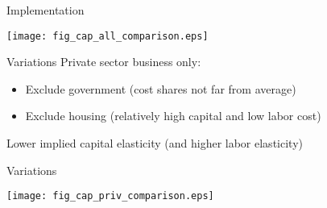 \documentclass[10pt, xcolor=dvipsnames]{beamer}
\begin{document}
%
%





\begin{frame}{Implementation}
\begin{center}
\texttt{[image: fig\_cap\_all\_comparison.eps]}
\end{center}
\end{frame}


\begin{frame}{Variations}
Private sector business only:
\begin{itemize}
   \item Exclude government (cost shares not far from average)
   \item Exclude housing (relatively high capital and low labor cost)
\end{itemize} 

Lower implied capital elasticity (and higher labor elasticity)

\end{frame}

\begin{frame}{Variations}
\begin{center}
\texttt{[image: fig\_cap\_priv\_comparison.eps]}
\end{center}
\end{frame}
\end{document}
